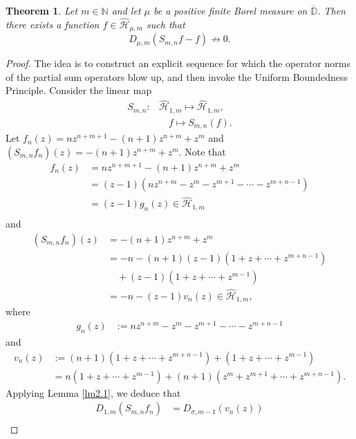 \documentclass[12pt,reqno]{amsart}
\newtheorem{theorem}{Theorem}[section]
\begin{document}
\begin{theorem}\label{tm3.2}
Let \( m \in \mathbb{N} \) and let \( \mu \) be a positive finite Borel measure on \( \overline{\mathbb{D}} \).
Then there exists a function \( f \in \widehat{\mathcal{H}}_{\mu,m} \) such that
\[
D_{\mu,m}(S_{m,n}f - f) \not\to 0.
\]
\end{theorem}

\begin{proof}
The idea is to construct an explicit sequence for which the operator norms of the partial sum operators blow up, and then invoke the Uniform Boundedness Principle. Consider the linear map
\begin{align*}
S_{m,n}: &\widehat{\mathcal{H}}_{1,m} \longmapsto \widehat{\mathcal{H}}_{1,m},\\
          &\quad f \longmapsto S_{m,n}(f).
       \end{align*}
Let \( f_n(z) = n z^{n + m + 1} - (n + 1) z^{n + m} + z^m \) and $(S_{m,n}f_n)(z) = - (n + 1) z^{n + m} + z^m.$
Note that
\begin{align*}
f_n(z) &= n z^{n + m + 1} - (n + 1) z^{n + m} + z^m \\
       &= (z - 1) \left( n z^{n + m} - z^m - z^{m + 1} - \cdots - z^{m + n - 1} \right) \\
       &= (z-1){g_n}(z) \in \widehat{\mathcal{H}}_{1,m} \\
       \end{align*}
       and
\begin{align*}
(S_{m,n}f_n)(z)
&= - (n + 1) z^{n + m} + z^m \\
&= - n - (n + 1)(z - 1)(1 + z + \cdots + z^{m + n - 1}) \\
&\quad + (z - 1)(1 + z + \cdots + z^{m - 1}) \\
&= - n - (z - 1){v_n}(z) \in \widehat{\mathcal{H}}_{1,m},
\end{align*}
where
\begin{align*}
{g_n}(z)&:=n z^{n + m} - z^m - z^{m + 1} - \cdots - z^{m + n - 1}
\end{align*}
and
\begin{align*}
{v_n}(z)&:= (n + 1)(1 + z + \cdots + z^{m + n - 1})+ (1 + z + \cdots + z^{m - 1}) \\
&= n (1 + z + \cdots + z^{m - 1})+(n+1) (z^{m} + z^{m + 1} + \cdots + z^{m+n - 1}).
\end{align*}
Applying Lemma \ref{lm2.1}, we deduce that
\begin{align*}
D_{1,m}(S_{m,n}f_n)&= D_{\sigma ,m - 1} ({v_n}(z))\\

\end{align*}
\end{proof}
\end{document}
